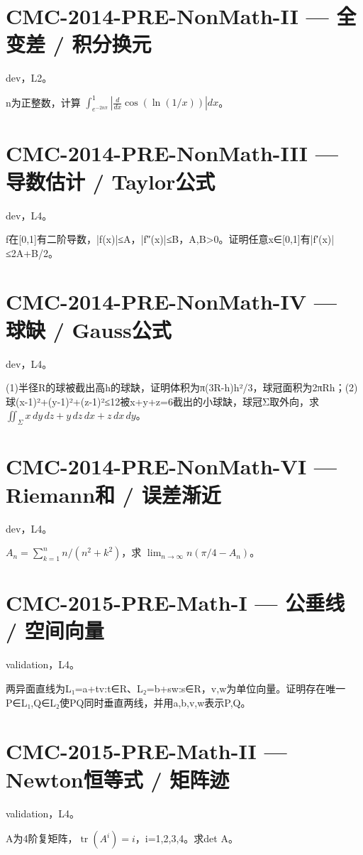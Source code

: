 \documentclass[UTF8]{ctexart}
\begin{document}
\section*{CMC-2014-PRE-NonMath-II — 全变差 / 积分换元}

dev，L2。

n为正整数，计算 $\int_{e^{-2n\pi}}^1|\frac d{dx}\cos(\ln(1/x))|dx$。

\section*{CMC-2014-PRE-NonMath-III — 导数估计 / Taylor公式}

dev，L4。

f在[0,1]有二阶导数，|f(x)|≤A，|f″(x)|≤B，A,B>0。证明任意x∈[0,1]有|f′(x)|≤2A+B/2。

\section*{CMC-2014-PRE-NonMath-IV — 球缺 / Gauss公式}

dev，L4。

(1)半径R的球被截出高h的球缺，证明体积为π(3R-h)h²/3，球冠面积为2πRh；(2)球(x-1)²+(y-1)²+(z-1)²≤12被x+y+z=6截出的小球缺，球冠Σ取外向，求 $\iint_\Sigma x\,dy\,dz+y\,dz\,dx+z\,dx\,dy$。

\section*{CMC-2014-PRE-NonMath-VI — Riemann和 / 误差渐近}

dev，L4。

$A_n=\sum_{k=1}^n n/(n^2+k^2)$，求 $\lim_{n\to\infty}n(\pi/4-A_n)$。

\section*{CMC-2015-PRE-Math-I — 公垂线 / 空间向量}

validation，L4。

两异面直线为L₁={a+tv:t∈R}、L₂={b+sw:s∈R}，v,w为单位向量。证明存在唯一P∈L₁,Q∈L₂使PQ同时垂直两线，并用a,b,v,w表示P,Q。

\section*{CMC-2015-PRE-Math-II — Newton恒等式 / 矩阵迹}

validation，L4。

A为4阶复矩阵，$\operatorname{tr}(A^i)=i$，i=1,2,3,4。求det A。
\end{document}
